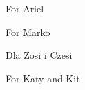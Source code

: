 
\thispagestyle{empty}

\vspace*{\fill}

For Ariel

\vspace*{2cm}
For Marko

\vspace*{2cm}
Dla Zosi i Czesi 

\vspace*{2cm}
For Katy and Kit


\setlength{\abovedisplayskip}{-5pt}
\setlength{\abovedisplayshortskip}{-5pt}
